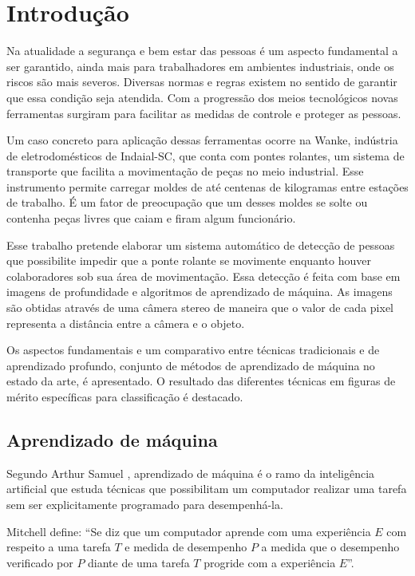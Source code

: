 \chapter{Introdução}

Na atualidade a segurança e bem estar das pessoas é um aspecto fundamental a ser garantido, ainda mais para trabalhadores em ambientes industriais, onde os riscos são mais severos. Diversas normas e regras existem no sentido de garantir que essa condição seja atendida. Com a progressão dos meios tecnológicos novas ferramentas surgiram para facilitar as medidas de controle e proteger as pessoas.

Um caso concreto para aplicação dessas ferramentas ocorre na Wanke, indústria de eletrodomésticos de Indaial-SC, que conta com pontes rolantes, um sistema de transporte que facilita a movimentação de peças no meio industrial. Esse instrumento permite carregar moldes de até centenas de kilogramas entre estações de trabalho. É um fator de preocupação que um desses moldes se solte ou contenha peças livres que caiam e firam algum funcionário. 

Esse trabalho pretende elaborar um sistema automático de detecção de pessoas que possibilite impedir que a ponte rolante se movimente enquanto houver colaboradores sob sua área de movimentação. Essa detecção é feita com base em imagens de profundidade e algoritmos de aprendizado de máquina. As imagens são obtidas através de uma câmera stereo de maneira que o valor de cada pixel representa a distância entre a câmera e o objeto. 

Os aspectos fundamentais e um comparativo entre técnicas tradicionais e de aprendizado profundo, conjunto de métodos de aprendizado de máquina no estado da arte, é apresentado. O resultado das diferentes técnicas em figuras de mérito específicas para classificação é destacado.

\section{Aprendizado de máquina}
Segundo Arthur Samuel \cite{Samuel59somestudies}, aprendizado de máquina é o ramo da inteligência artificial que estuda técnicas que possibilitam um computador realizar uma tarefa sem ser explicitamente programado para desempenhá-la. 

Mitchell \cite{Mitchell:ML} define: ``Se diz que um computador aprende com uma experiência $E$ com respeito a uma tarefa $T$ e medida de desempenho $P$ a medida que o desempenho verificado por $P$ diante de uma tarefa $T$ progride com a experiência $E$''. 

